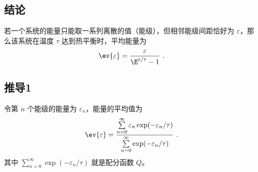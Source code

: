 
\begin{issues}
\issueDraft
\end{issues}


\subsection{结论}
若一个系统的能量只能取一系列离散的值（能级），但相邻能级间距恰好为 $\varepsilon$，那么该系统在温度 $\tau$ 达到热平衡时，平均能量为
\begin{equation}
\ev{\varepsilon} = \frac{\varepsilon}{\E^{\varepsilon/\tau} - 1}~.
\end{equation}

\subsection{推导1}
令第 $n$ 个能级的能量为 $\varepsilon_n$，能量的平均值为
\begin{equation}\label{eq_EqCE_2}
\ev{\varepsilon} = \frac{\sum\limits_{n = 0}^\infty  \varepsilon_n \exp(-\varepsilon_n/\tau)}{\sum\limits_{n = 0}^\infty \exp(-\varepsilon_n/\tau)}~.
\end{equation}
其中 $\sum\limits_{n = 0}^\infty \exp(-\varepsilon_n/\tau)$ 就是配分函数 $Q$。

